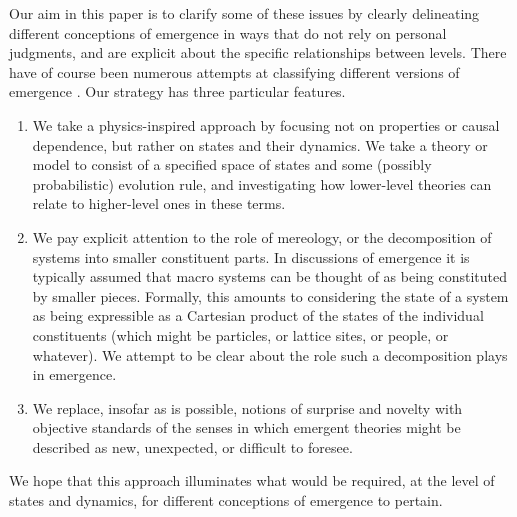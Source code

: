 \documentclass[12pt,english]{article}
\newcommand{\autocite}{\cite}
\begin{document}
Our aim in this paper is to clarify some of these issues by clearly delineating different conceptions of emergence in ways that do not rely on personal judgments, and are explicit about the specific relationships between levels.
There have of course been numerous attempts at classifying different versions of emergence \autocite{sep-properties-emergent,wilson2021metaphysical}.
Our strategy has three particular features.
\begin{enumerate}
\item We take a physics-inspired approach by focusing not on properties or causal dependence, but rather on states and their dynamics.
We take a theory or model to consist of a specified space of states and some (possibly probabilistic) evolution rule, and investigating how lower-level theories can relate to higher-level ones in these terms.
    \item We pay explicit attention to the role of mereology, or the decomposition of systems into smaller constituent parts. In discussions of emergence it is typically assumed that macro systems can be thought of as being constituted by smaller pieces. Formally, this amounts to considering the state of a system as being expressible as a Cartesian product of the states of the individual constituents (which might be particles, or lattice sites, or people, or whatever). 
    We attempt to be clear about the role such a decomposition plays in emergence.
    \item We replace, insofar as is possible, notions of surprise and novelty with objective standards of the senses in which emergent theories might be described as new, unexpected, or difficult to foresee.
\end{enumerate}
We hope that this approach illuminates what would be required, at the level of states and dynamics, for different conceptions of emergence to pertain.
\end{document}
